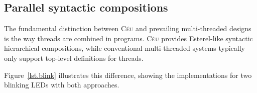 \documentclass[10pt]{sensys-proc}
\newcommand{\CEU}{\textsc{C\'{e}u}\xspace}
\newcommand{\code}[1] {{\small{\texttt{#1}}}}
\begin{document}
\begin{comment}
trails = lightweight threads
\CEU{} is a concurrent language in which multiple lines of execution (known as 
\emph{trails}) continuously react to input events from the environment.
Waiting for an event halts the running trail until that event occurs.
The environment broadcasts occurring events to all active trails, which share a 
single global time reference (an event itself).

The following example executes two trails in parallel that show in leds the 
received values from a radio:

\begin{Verbatim}[commandchars=\\\{\}]
    (\til{}Radio_recv \til{}> v)* || (\til{}v \til{}> Leds_set)*
\end{Verbatim}

The first trail (on the left of the \code{||} parallel operator) awaits 
(\code{\til}) the external input event $Radio\_recv$, then triggers 
(\code{\til>}) the internal event $v$, and then loops (\code{*}), repeating the 
process.
The second trail awaits the internal event $v$, then triggers the external 
output event $Leds\_set$, and then loops back.
In other words, whenever a radio message is received, the first trail resumes 
and awakes the second trail passing the received value through the internal 
event $v$.

The basic distinctions are that the \code{await} primitive not only yields 
control back to the system, but also registers the event that should 
re-schedule the trail.
Again, it is not only a matter of lightweight syntax, but also XXX the compiler 
to know about the program execution flow.
\end{comment}

\subsection{Parallel syntactic compositions}
\label{sec.ceu.par}

The fundamental distinction between \CEU and prevailing multi-threaded designs 
is the way threads are combined in programs.
\CEU provides Esterel-like syntactic hierarchical compositions, while 
conventional multi-threaded systems typically only support top-level 
definitions for threads.

Figure~\ref{lst.blink} illustrates this difference, showing the implementations 
for two blinking LEDs with both approaches.
\end{document}
